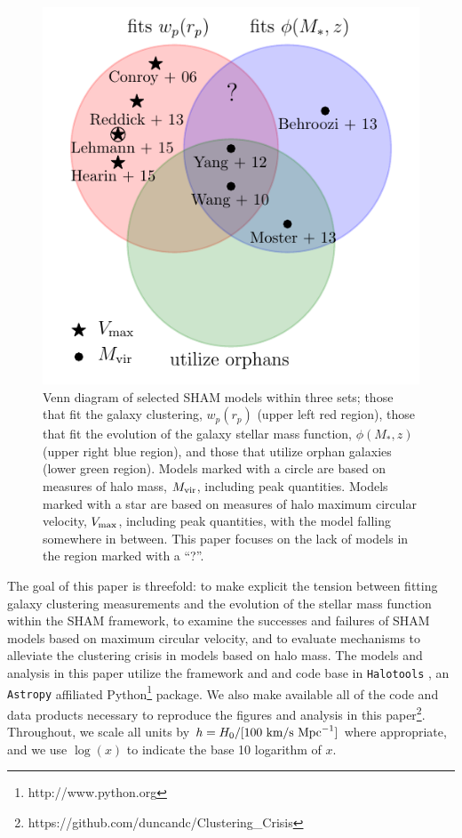 \documentclass[a4paper,fleqn,usenatbib]{mnras}
\begin{document}
\begin{figure}
    \includegraphics{figures/venn_diagram.pdf}
    \caption{Venn diagram of selected SHAM models within three sets; those that fit the galaxy clustering, $w_p(r_p)$ (upper left red region), those that fit the evolution of the galaxy stellar mass function, $\phi(M_*,z)$ (upper right blue region), and those that utilize orphan galaxies (lower green region).  Models marked with a circle are based on measures of halo mass, $M_{\rm vir}$, including peak quantities.  Models marked with a star are based on measures of halo maximum circular velocity, $V_{\rm max}$, including peak quantities, with the \citet{Lehmann:2015vi} model falling somewhere in between.   This paper focuses on the lack of models in the region marked with a ``?''. }
    \label{fig:venn_diagram}
\end{figure}

The goal of this paper is threefold: to make explicit the tension between fitting galaxy clustering measurements and the evolution of the stellar mass function within the SHAM framework, to examine the successes and failures of SHAM models based on maximum circular velocity, and to evaluate mechanisms to alleviate the clustering crisis in models based on halo mass.  The models and analysis in this paper utilize the framework and and code base in {\tt Halotools} \citep{Hearin:2016tc}, an {\tt Astropy} \citep{TheAstropyCollaboration:2013cd} affiliated Python\footnote{http://www.python.org} package.  We also make available all of the code and data products necessary to reproduce the figures and analysis in this paper\footnote{https://github.com/duncandc/Clustering\_Crisis}.  Throughout, we scale all units by $h = H_0/[100~{\rm km/s}~{\rm Mpc}^{-1}]$ where appropriate, and we use $\log(x)$ to indicate the base 10 logarithm of $x$. 
\end{document}
